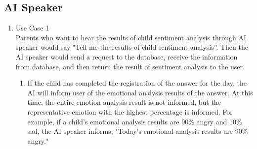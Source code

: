 \documentclass[conference]{IEEEtran}
\begin{document}
\subsection{AI Speaker}
\begin{enumerate}
    \item Use Case 1 
    \\Parents who want to hear the results of child sentiment analysis through AI speaker would say "Tell me the results of child sentiment analysis”. Then the AI speaker would send a request to the database, receive the information from database, and then return the result of sentiment analysis to the user.\newline
    \begin{enumerate}
        \item If the child has completed the registration of the answer for the day, the AI will inform user of the emotional analysis results of the answer. At this time, the entire emotion analysis result is not informed, but the representative emotion with the highest percentage is informed. For example, if a child's emotional analysis results are 90\% angry and 10\% sad, the AI speaker informs, "Today's emotional analysis results are 90\% angry."\newline


\end{enumerate}
\end{enumerate}
\end{document}
